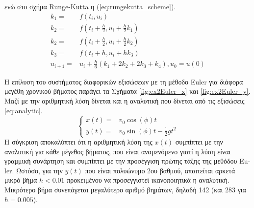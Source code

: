 \documentclass[assignment4.tex]{subfiles}
\begin{document}
ενώ στο σχήμα \textlatin{Runge-Kutta} η (\ref{eq:rungekutta_scheme}).
\begin{equation}
\begin{split}
k_1 =& f(t_i, u_i) \\
k_2 =& f(t_i+\frac{h}{2}, u_i+\frac{h}{2}k_1) \\
k_2 =& f(t_i+\frac{h}{2}, u_i+\frac{h}{2}k_2) \\
k_3 =& f(t_i+h, u_i + h k_3) \\
u_{i+1} =& u_i + \frac{h}{6}\left(k_1 + 2k_2 + 2k_3+ k_4\right), u_0=u(0)
\end{split}
\label{eq:rungekutta_scheme}
\end{equation}

Η επίλυση του συστήματος διαφορικών εξισώσεων με τη μέθοδο \textlatin{Euler} για διάφορα μεγέθη χρονικού βήματος παράγει τα Σχήματα \ref{fig:ex2Euler_x} και \ref{fig:ex2Euler_y}. Μαζί με την αριθμητική λύση δίνεται και η αναλυτική που δίνεται από τις εξισώσεις \ref{eq:analytic}.
\begin{equation}
\left\{
\begin{matrix}
x(t) =& v_0\cos(\phi) t \\
y(t) =& v_0\sin(\phi) t - \frac{1}{2}gt^2
\end{matrix}
\right.
\label{eq:analytic}
\end{equation}
Η σύγκριση αποκαλύπτει ότι η αριθμητική λύση της $x(t)$ συμπίπτει με την αναλυτική για κάθε μέγεθος βήματος, που είναι αναμενόμενο γιατί η λύση είναι γραμμική συνάρτηση και συμπίπτει με την προσέγγιση πρώτης τάξης της μεθόδου \textlatin{Euler}. Ωστόσο, για την $y(t)$ που είναι πολυώνυμο 2ου βαθμού, απαιτείται αρκετά μικρό βήμα $h<0.01$ προκειμένου να προσεγγιστεί ικανοποιητικά η αναλυτική. Μικρότερο βήμα συνεπάγεται μεγαλύτερο αριθμό βημάτων, δηλαδή 142 (και 283 για $h=0.005$). 
\end{document}
